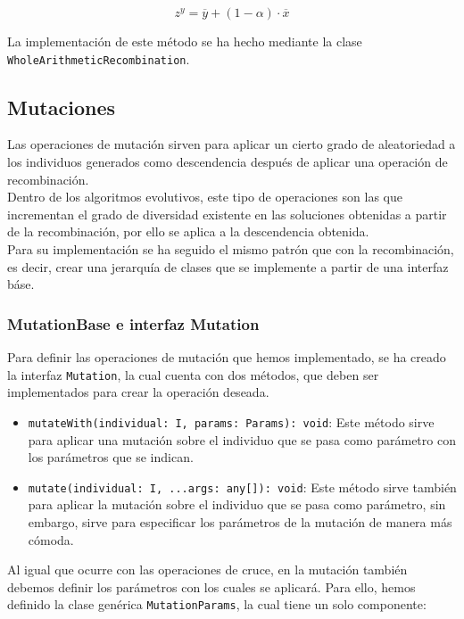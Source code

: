 \begin{equation}
    z^y = \overline{y} + (1 - \alpha) \cdot \overline{x}
\end{equation}

La implementación de este método se ha hecho mediante la clase \texttt{WholeArithmeticRecombination}.

\subsection{Mutaciones}

Las operaciones de mutación sirven para aplicar un cierto grado de aleatoriedad a los individuos generados como descendencia después de aplicar una operación de recombinación. \\

Dentro de los algoritmos evolutivos, este tipo de operaciones son las que incrementan el grado de diversidad existente en las soluciones obtenidas a partir de la recombinación, por ello se aplica a la descendencia obtenida. \\

Para su implementación se ha seguido el mismo patrón que con la recombinación, es decir, crear una jerarquía de clases que se implemente a partir de una interfaz báse.

\subsubsection{MutationBase e interfaz Mutation}

Para definir las operaciones de mutación que hemos implementado, se ha creado la interfaz \texttt{Mutation}, la cual cuenta con dos métodos, que deben ser implementados para crear la operación deseada.

\begin{itemize}
    \item \texttt{mutateWith(individual: I, params: Params): void}: Este método sirve para aplicar una mutación sobre el individuo que se pasa como parámetro con los parámetros que se indican.
    \item \texttt{mutate(individual: I, ...args: any[]): void}: Este método sirve también para aplicar la mutación sobre el individuo que se pasa como parámetro, sin embargo, sirve para especificar los parámetros de la mutación de manera más cómoda.
\end{itemize}

Al igual que ocurre con las operaciones de cruce, en la mutación también debemos definir los parámetros con los cuales se aplicará. Para ello, hemos definido la clase genérica \texttt{MutationParams}, la cual tiene un solo componente:

